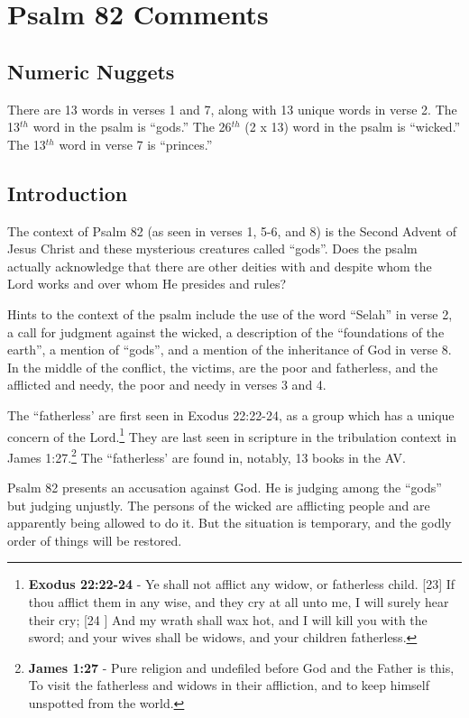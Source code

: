 \section{Psalm 82 Comments}

\subsection{Numeric Nuggets}
There are 13 words in verses 1 and 7, along with 13 unique words in verse 2. The 13$^{th}$ word in the psalm is ``gods.''  The 26$^{th}$ (2 x 13) word in the psalm is ``wicked.'' The 13$^{th}$ word in verse 7 is ``princes.''

\subsection{Introduction}
The context of Psalm 82 (as seen in verses 1, 5-6, and 8) is the Second Advent of Jesus Christ and these mysterious creatures called ``gods''.  Does the psalm actually  acknowledge that there are other deities with and despite whom the Lord works and over whom He presides and rules? 

Hints to the context of the psalm include the use of the word ``Selah'' in verse 2, a call for judgment against the wicked, a description of the ``foundations of the earth'', a mention of ``gods'', and a mention of the inheritance of God in verse 8. In the middle of the conflict, the victims, are the poor and fatherless, and the afflicted and needy, the poor and needy in verses 3 and 4. 

The ``fatherless' are first seen in Exodus 22:22-24, as a group which has a unique concern of the Lord.\footnote{\textbf{Exodus 22:22-24} - Ye shall not afflict any widow, or fatherless child. [23] If thou afflict them in any wise, and they cry at all unto me, I will surely hear their cry; [24 ] And my wrath shall wax hot, and I will kill you with the sword; and your wives shall be widows, and your children fatherless.} They are last seen in scripture in the tribulation context in James 1:27.\footnote{\textbf{James 1:27} - Pure religion and undefiled before God and the Father is this, To visit the fatherless and widows in their affliction, and to keep himself unspotted from the world.} The ``fatherless' are found in, notably, 13 books in the AV. 

Psalm 82 presents an accusation against God. He is judging among the ``gods'' but judging unjustly. The persons of the wicked are afflicting people and are apparently being allowed to do it.  But the situation is temporary, and the godly order of things will be restored.


